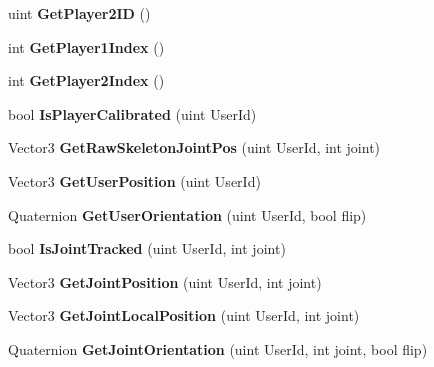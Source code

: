 \begin{DoxyCompactItemize}
uint {\bfseries Get\+Player2\+ID} ()
\item 
\mbox{\label{class_kinect_manager_ac1073faa906fd0fa1974d0d064a710f8}} 
int {\bfseries Get\+Player1\+Index} ()
\item 
\mbox{\label{class_kinect_manager_a85ab5d1f3a4bf3b208291127941378a2}} 
int {\bfseries Get\+Player2\+Index} ()
\item 
\mbox{\label{class_kinect_manager_ac63bc71be34ca7399ff1a097abe9f679}} 
bool {\bfseries Is\+Player\+Calibrated} (uint User\+Id)
\item 
\mbox{\label{class_kinect_manager_a425f59c9b84e1e89f93b8b1091b4d473}} 
Vector3 {\bfseries Get\+Raw\+Skeleton\+Joint\+Pos} (uint User\+Id, int joint)
\item 
\mbox{\label{class_kinect_manager_aca20e9d8cd5ebb481673fcf63b6b18fc}} 
Vector3 {\bfseries Get\+User\+Position} (uint User\+Id)
\item 
\mbox{\label{class_kinect_manager_a7f15cd908891e9cee89520cb63f45577}} 
Quaternion {\bfseries Get\+User\+Orientation} (uint User\+Id, bool flip)
\item 
\mbox{\label{class_kinect_manager_ac55fb953a35d5290e0004fb9ac4cc139}} 
bool {\bfseries Is\+Joint\+Tracked} (uint User\+Id, int joint)
\item 
\mbox{\label{class_kinect_manager_acda02655d464aaa83c8b71ca492805d3}} 
Vector3 {\bfseries Get\+Joint\+Position} (uint User\+Id, int joint)
\item 
\mbox{\label{class_kinect_manager_a1b74d41febb7bf73681c4a8f2f5b0f19}} 
Vector3 {\bfseries Get\+Joint\+Local\+Position} (uint User\+Id, int joint)
\item 
\mbox{\label{class_kinect_manager_aa11213684be7e8f0f79ada8fb1fee9c5}} 
Quaternion {\bfseries Get\+Joint\+Orientation} (uint User\+Id, int joint, bool flip)
\item 
\mbox{\label{class_kinect_manager_a11b8288ad51dc8f11c05c92efb041572}} 

\end{DoxyCompactItemize}
